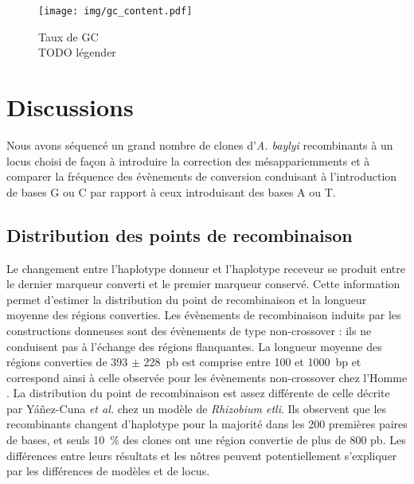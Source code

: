   \null
  \vfill


  \begin{figure}[htbp]
    \centering


    \texttt{[image: img/gc\_content.pdf]}

    \caption[Taux de GC]{Taux de GC \\
      TODO légender}
    \label{fig:gctaux}
  \end{figure}

  \vfill
  \thispagestyle{empty}
  \addtocounter{page}{-1}
  \clearpage
  \newpage

\section{Discussions}
\label{sec:discussions}

Nous avons séquencé un grand nombre de clones d'\emph{A. baylyi} recombinants à
un locus choisi de façon à introduire la correction des mésappariemments et à
comparer la fréquence des évènements de conversion conduisant à l'introduction
de bases G ou C par rapport à ceux introduisant des bases A ou T.

\subsection{Distribution des points de recombinaison}

\afterpage{\blankpage}

Le changement entre l'haplotype donneur et l'haplotype receveur se produit entre
le dernier marqueur converti et le premier marqueur conservé. Cette information
permet d'estimer la distribution du point de recombinaison et la longueur
moyenne des régions converties. Les évènements de recombinaison induits par les
constructions donneuses sont des évènements de type non-crossover : ils ne
conduisent pas à l'échange des régions flanquantes\cite{chen_gene_2007}. La
longueur moyenne des régions converties de \num{393} \(\pm\) \num{228}~pb est
comprise entre \num{100} et \num{1000}~bp et correspond ainsi à celle observée
pour les évènements non-crossover chez l'Homme
\cite{williams_non-crossover_2015}. La distribution du point de recombinaison
est assez différente de celle décrite par Yáñez-Cuna \emph{et
  al.}\cite{yanez-cuna_biased_2015} chez un modèle de \emph{Rhizobium etli}. Ils
observent que les recombinants changent d'haplotype pour la majorité dans les
\num{200} premières paires de bases, et seuls \SI{10}{\percent} des clones ont
une région convertie de plus de \num{800} pb. Les différences entre leurs
résultats et les nôtres peuvent potentiellement s'expliquer par les différences
de modèles et de locus.

